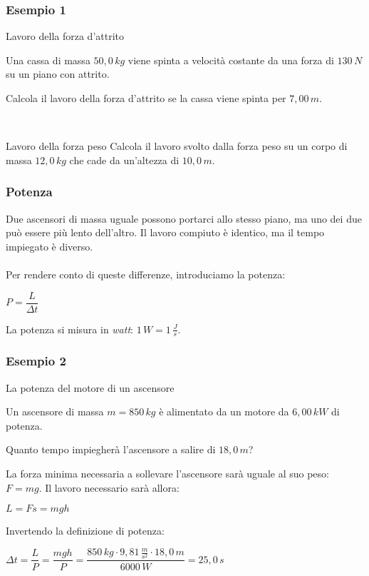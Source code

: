 \documentclass[]{beamer}
\theoremstyle{plain}
\begin{document}
\begin{frame}
\frametitle{Esempio 1}
\begin{exampleblock}{Lavoro della forza d'attrito}
{\small Una cassa di massa $ 50,0 \, kg $ viene spinta a velocità costante da una forza di $ 130 \, N $ su un piano con attrito.

Calcola il lavoro della forza d'attrito se la cassa viene spinta per $ 7,00 \, m $.}
\end{exampleblock}

~

\begin{exampleblock}{Lavoro della forza peso}
{\small Calcola il lavoro svolto dalla forza peso su un corpo di massa $ 12,0 \, kg $ che cade da un'altezza di $ 10,0 \, m $.}
\end{exampleblock}
\end{frame}





\begin{frame}
  \frametitle{Potenza}
  Due ascensori di massa uguale possono portarci allo stesso piano, ma uno dei due può essere più lento dell'altro. Il lavoro compiuto è identico, ma il tempo impiegato è diverso.\\~\pause\\ Per rendere conto di queste differenze, introduciamo la \alert{potenza}:
  \begin{center}
\colorbox{blue!30}{$ P = \dfrac{L}{\Delta t} $}
\end{center}
La potenza si misura in \emph{watt}: $ 1 \, W = 1 \, \frac{J}{s} $.
\end{frame}


\begin{frame}
  \frametitle{Esempio 2}
  \begin{exampleblock}{La potenza del motore di un ascensore}
{\small Un ascensore di massa $ m =  850 \, kg $ è alimentato da un motore da $ 6,00 \, kW $ di potenza. 

Quanto tempo impiegherà l'ascensore a salire di $ 18,0 \, m $?}
\end{exampleblock}
  \pause
  La forza minima necessaria a sollevare l'ascensore sarà uguale al suo peso: $ F = mg $. Il lavoro necessario sarà allora:
  \begin{center}
  $ L = Fs = mgh $
  \end{center}\pause
  Invertendo la definizione di potenza:
  \begin{center}
  $ \Delta t = \dfrac{L}{P} = \dfrac{mgh}{P} = \dfrac{850 \, kg \cdot 9,81 \, \frac{m}{s^2}\cdot 18,0 \, m }{6000 \, W} = 25,0 \, s $
  \end{center}
\end{frame}
\end{document}
